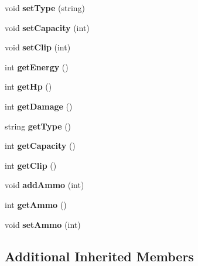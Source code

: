 \begin{DoxyCompactItemize}
void {\bfseries set\+Type} (string)
\item 
\mbox{\label{classLaserTurrent_a68076497433ef24484ac58ff375b8e1d}} 
void {\bfseries set\+Capacity} (int)
\item 
\mbox{\label{classLaserTurrent_afbf817a9fd94ce1b477bff0ae1ff6a22}} 
void {\bfseries set\+Clip} (int)
\item 
\mbox{\label{classLaserTurrent_a083004d4112aca25502da36cea69946e}} 
int {\bfseries get\+Energy} ()
\item 
\mbox{\label{classLaserTurrent_a0614146180946890d8448529407d6e37}} 
int {\bfseries get\+Hp} ()
\item 
\mbox{\label{classLaserTurrent_ac0f0e87559c6b483a973a7dccab40147}} 
int {\bfseries get\+Damage} ()
\item 
\mbox{\label{classLaserTurrent_aa00a032e9342cf991ab9326cb21ca175}} 
string {\bfseries get\+Type} ()
\item 
\mbox{\label{classLaserTurrent_a79723a21888c6435daaab8a90733259a}} 
int {\bfseries get\+Capacity} ()
\item 
\mbox{\label{classLaserTurrent_aca5de8e192b8059e8f38a4a314ca71db}} 
int {\bfseries get\+Clip} ()
\item 
\mbox{\label{classLaserTurrent_aaed233fc5126f46dbc517af607d6d9e1}} 
void {\bfseries add\+Ammo} (int)
\item 
\mbox{\label{classLaserTurrent_a64f7b01a6f7ab40f18e59725b8060284}} 
int {\bfseries get\+Ammo} ()
\item 
\mbox{\label{classLaserTurrent_a83c993201149747f200a0842cf488d86}} 
void {\bfseries set\+Ammo} (int)
\end{DoxyCompactItemize}
\subsection*{Additional Inherited Members}



